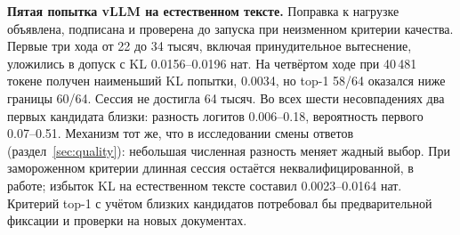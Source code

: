 \textbf{Пятая попытка vLLM на естественном тексте.} Поправка к нагрузке объявлена, подписана и проверена
до запуска при неизменном критерии качества. Первые три хода от 22 до 34 тысяч, включая принудительное вытеснение,
уложились в допуск с KL 0.0156--0.0196 нат. На четвёртом ходе при 40\,481 токене получен
наименьший KL попытки, 0.0034, но top-1 58/64 оказался ниже границы 60/64. Сессия не достигла 64 тысяч.
Во всех шести несовпадениях два первых кандидата близки: разность логитов 0.006--0.18,
вероятность первого 0.07--0.51. Механизм тот же, что в исследовании смены ответов
(раздел~\ref{sec:quality}): небольшая численная разность меняет жадный выбор.
При замороженном критерии длинная сессия остаётся неквалифицированной, в работе;
избыток KL на естественном тексте составил 0.0023--0.0164 нат.
Критерий top-1 с учётом близких кандидатов потребовал бы предварительной фиксации и проверки на новых документах.
